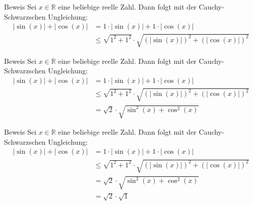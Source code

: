 \documentclass[10pt]{beamer}
\def\bR{\mathbb{R}}
\begin{document}
\begin{frame}{Beweis}
    Sei \( x \in \bR \) eine beliebige reelle Zahl. Dann folgt mit der Cauchy-Schwarzschen Ungleichung:
    \begin{align*}
        \left\vert \sin\left( x \right) \right\vert + \left\vert \cos\left( x \right) \right\vert
        & = 1 \cdot \left\vert \sin\left( x \right) \right\vert + 1 \cdot \left\vert \cos\left( x \right) \right\vert \\
        & \leq \sqrt{1^{2} + 1^{2}} \cdot \sqrt{\left( \left\vert \sin\left( x \right) \right\vert \right)^{2} + \left( \left\vert \cos\left( x \right) \right\vert \right)^{2}}
    \end{align*}
\end{frame}



\begin{frame}{Beweis}
    Sei \( x \in \bR \) eine beliebige reelle Zahl. Dann folgt mit der Cauchy-Schwarzschen Ungleichung:
    \begin{align*}
        \left\vert \sin\left( x \right) \right\vert + \left\vert \cos\left( x \right) \right\vert
        & = 1 \cdot \left\vert \sin\left( x \right) \right\vert + 1 \cdot \left\vert \cos\left( x \right) \right\vert \\
        & \leq \sqrt{1^{2} + 1^{2}} \cdot \sqrt{\left( \left\vert \sin\left( x \right) \right\vert \right)^{2} + \left( \left\vert \cos\left( x \right) \right\vert \right)^{2}} \\
        & = \sqrt{2} \cdot \sqrt{\sin^{2}\left( x \right) + \cos^{2}\left( x \right)}
    \end{align*}
\end{frame}



\begin{frame}{Beweis}
    Sei \( x \in \bR \) eine beliebige reelle Zahl. Dann folgt mit der Cauchy-Schwarzschen Ungleichung:
    \begin{align*}
        \left\vert \sin\left( x \right) \right\vert + \left\vert \cos\left( x \right) \right\vert
        & = 1 \cdot \left\vert \sin\left( x \right) \right\vert + 1 \cdot \left\vert \cos\left( x \right) \right\vert \\
        & \leq \sqrt{1^{2} + 1^{2}} \cdot \sqrt{\left( \left\vert \sin\left( x \right) \right\vert \right)^{2} + \left( \left\vert \cos\left( x \right) \right\vert \right)^{2}} \\
        & = \sqrt{2} \cdot \sqrt{\sin^{2}\left( x \right) + \cos^{2}\left( x \right)} \\
        & = \sqrt{2} \cdot \sqrt{1}
    \end{align*}
\end{frame}
\end{document}
